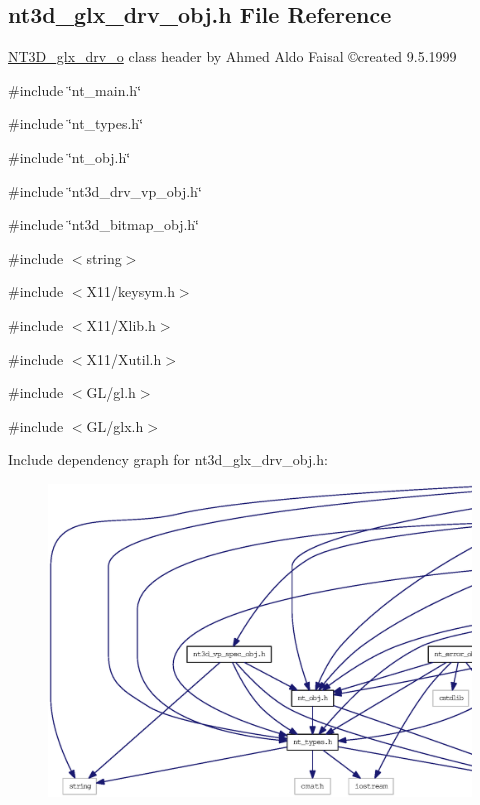 \subsection{nt3d\_\-glx\_\-drv\_\-obj.h File Reference}
\label{nt3d__glx__drv__obj_8h}



\begin{DoxyItemize}
\item \hyperlink{class_n_t3_d__glx__drv__o}{NT3D\_\-glx\_\-drv\_\-o} class header by Ahmed Aldo Faisal \copyright created 9.5.1999 
\end{DoxyItemize} 


{\ttfamily \#include \char`\"{}nt\_\-main.h\char`\"{}}\par
{\ttfamily \#include \char`\"{}nt\_\-types.h\char`\"{}}\par
{\ttfamily \#include \char`\"{}nt\_\-obj.h\char`\"{}}\par
{\ttfamily \#include \char`\"{}nt3d\_\-drv\_\-vp\_\-obj.h\char`\"{}}\par
{\ttfamily \#include \char`\"{}nt3d\_\-bitmap\_\-obj.h\char`\"{}}\par
{\ttfamily \#include $<$string$>$}\par
{\ttfamily \#include $<$X11/keysym.h$>$}\par
{\ttfamily \#include $<$X11/Xlib.h$>$}\par
{\ttfamily \#include $<$X11/Xutil.h$>$}\par
{\ttfamily \#include $<$GL/gl.h$>$}\par
{\ttfamily \#include $<$GL/glx.h$>$}\par
Include dependency graph for nt3d\_\-glx\_\-drv\_\-obj.h:
\nopagebreak
\begin{figure}[H]
\begin{center}
\leavevmode
\includegraphics[width=400pt]{nt3d__glx__drv__obj_8h__incl}
\end{center}
\end{figure}
